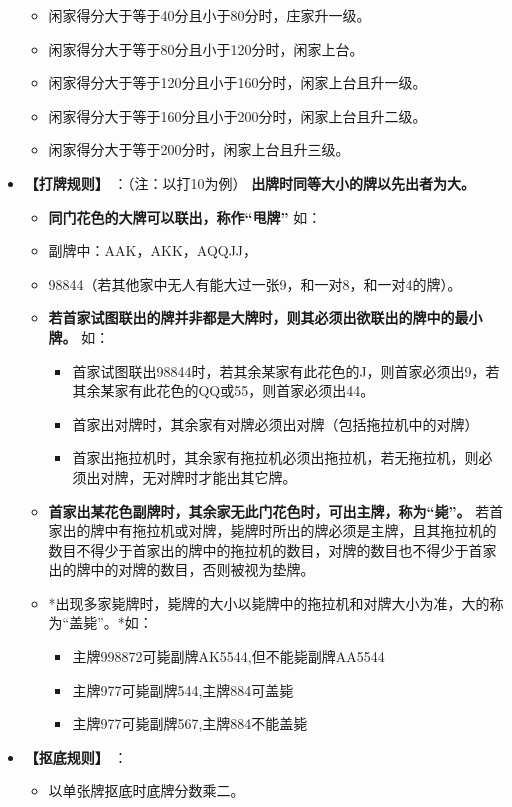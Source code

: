 \documentclass[9pt, b5paper]{article}
\begin{document}
\begin{itemize}
\begin{itemize}
\item 闲家得分大于等于40分且小于80分时，庄家升一级。
\item 闲家得分大于等于80分且小于120分时，闲家上台。
\item 闲家得分大于等于120分且小于160分时，闲家上台且升一级。
\item 闲家得分大于等于160分且小于200分时，闲家上台且升二级。
\item 闲家得分大于等于200分时，闲家上台且升三级。
\end{itemize}
\item \textbf{【打牌规则】} ：（注：以打10为例） \textbf{出牌时同等大小的牌以先出者为大。}
\begin{itemize}
\item \textbf{同门花色的大牌可以联出，称作“甩牌”} 如：
\item 副牌中：AAK，AKK，AQQJJ，
\item 98844（若其他家中无人有能大过一张9，和一对8，和一对4的牌）。
\item \textbf{若首家试图联出的牌并非都是大牌时，则其必须出欲联出的牌中的最小牌。} 如：
\begin{itemize}
\item 首家试图联出98844时，若其余某家有此花色的J，则首家必须出9，若其余某家有此花色的QQ或55，则首家必须出44。
\item 首家出对牌时，其余家有对牌必须出对牌（包括拖拉机中的对牌）
\item 首家出拖拉机时，其余家有拖拉机必须出拖拉机，若无拖拉机，则必须出对牌，无对牌时才能出其它牌。
\end{itemize}
\item \textbf{首家出某花色副牌时，其余家无此门花色时，可出主牌，称为“毙”。} 若首家出的牌中有拖拉机或对牌，毙牌时所出的牌必须是主牌，且其拖拉机的数目不得少于首家出的牌中的拖拉机的数目，对牌的数目也不得少于首家出的牌中的对牌的数目，否则被视为垫牌。
\item *出现多家毙牌时，毙牌的大小以毙牌中的拖拉机和对牌大小为准，大的称为“盖毙”。*如：
\begin{itemize}
\item 主牌998872可毙副牌AK5544,但不能毙副牌AA5544
\item 主牌977可毙副牌544,主牌884可盖毙
\item 主牌977可毙副牌567,主牌884不能盖毙
\end{itemize}
\end{itemize}
\item \textbf{【抠底规则】} ：
\begin{itemize}
\item 以单张牌抠底时底牌分数乘二。

\end{itemize}
\end{itemize}
\end{document}
